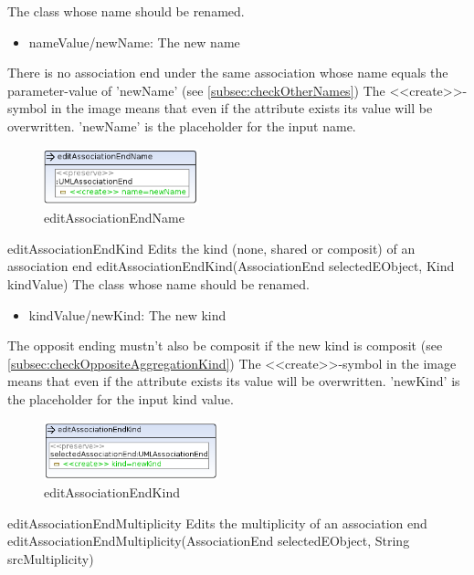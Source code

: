 {The class whose name should be renamed.}
{
\begin{itemize}
 \item nameValue/newName: The new name
\end{itemize}
}
{There is no association end under the same association whose name equals the
parameter-value of 'newName' (see
\ref{subsec:checkOtherNames})}
{The \textless\textless create\textgreater\textgreater  -symbol in the image
means that even if the attribute exists its value will be overwritten.
'newName' is the placeholder for the input name.}
\begin{figure}[H]
  \centering
  \includegraphics[width=0.4\textwidth]{pics/editAssociationEndName.png}
  \caption{editAssociationEndName}
  \label{editAssociationEndName}
\end{figure}
\op
{editAssociationEndKind}
{Edits the kind (none, shared or composit) of an association end}
{editAssociationEndKind(AssociationEnd selectedEObject, Kind kindValue)}
{The class whose name should be renamed.}
{
\begin{itemize}
 \item kindValue/newKind: The new kind
\end{itemize}
}
{The opposit ending mustn't also be composit if the new kind is composit
(see
\ref{subsec:checkOppositeAggregationKind})}
{The \textless\textless create\textgreater\textgreater  -symbol in the image
means that even if the attribute exists its value will be overwritten.
'newKind' is the placeholder for the input kind value.}
\begin{figure}[H]
  \centering
  \includegraphics[width=0.45\textwidth]{pics/editAssociationEndKind.png}
  \caption{editAssociationEndKind}
  \label{editAssociationEndKind}
\end{figure}
\op
{editAssociationEndMultiplicity}
{Edits the multiplicity of an association end}
{editAssociationEndMultiplicity(AssociationEnd selectedEObject, String
srcMultiplicity)}
